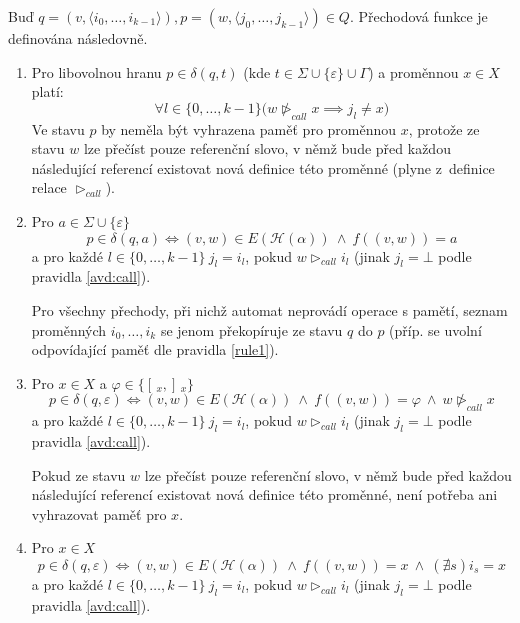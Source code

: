 \documentclass[thesis=B,czech]{FITthesis}[2019/12/23]
\theoremstyle{definition}
\begin{document}
Buď $q=(v, \langle i_0, \dots, i_{k-1} \rangle), p=(w, \langle j_0, \dots, j_{k-1} \rangle) \in Q$. Přechodová funkce je definována následovně.
\begin{enumerate}
	\item{\label{avd:call} Pro libovolnou hranu $p \in \delta(q, t)$ (kde ${t \in \Sigma \cup \{\varepsilon\} \cup \Gamma}$) a proměnnou $x \in X$ platí:	\begin{equation}\forall l \in \{0, \dots, k-1\} \big( w \ntriangleright_{call} x \implies j_l \ne x) \end{equation}
	Ve stavu $p$ by neměla být vyhrazena paměť pro proměnnou $x$, protože ze stavu $w$ lze přečíst pouze referenční slovo, v němž bude před každou následující referencí existovat nová definice této proměnné (plyne z~definice relace $\triangleright_{call}$).
		}
	\item\label{rule2}{Pro $a \in \Sigma\cup\{\varepsilon\}$ 
			\begin{equation}
			p \in \delta(q, a) \iff (v, w) \in E(\mathcal{H}(\alpha)) \ \wedge \ f((v, w))=a
			\end{equation} a pro každé $l \in \{0, \dots, k-1\} \  j_l = i_l$, pokud $w \triangleright_{call} i_l$ (jinak $j_l = \bot$ podle pravidla \ref{avd:call}).
			
		Pro všechny přechody, při nichž automat neprovádí operace s pamětí, seznam proměnných $i_0, \dots, i_k$ se jenom překopíruje ze stavu $q$ do $p$ (příp. se uvolní odpovídající paměť dle pravidla \ref{rule1}). } 
 
	\item{\label{rule3}Pro $x \in X$ a $\varphi \in \{[\,_x, ]\,_x\}$
	 \begin{equation} p \in \delta(q, \varepsilon) \iff (v, w) \in E(\mathcal{H}(\alpha)) \ \wedge \ f((v, w))=\varphi \ \wedge \  w \ntriangleright_{call} x
	\end{equation}  a 
			pro každé $l \in \{0, \dots, k-1\} \  j_l = i_l$, pokud $w \triangleright_{call} i_l$ (jinak $j_l = \bot$ podle pravidla \ref{avd:call}).

Pokud ze stavu $w$ lze přečíst pouze referenční slovo, v němž bude před každou následující referencí existovat nová definice této proměnné, není potřeba ani vyhrazovat paměť pro $x$.}
	\item{Pro $x \in X$ 
		\begin{equation}p \in \delta(q, \varepsilon) \iff (v, w) \in E(\mathcal{H}(\alpha)) \ \wedge \ f((v, w))= x \ \wedge \ (\nexists s) i_s = x
		\end{equation} a 
			pro každé $l \in \{0, \dots, k-1\} \  j_l = i_l$, pokud $w \triangleright_{call} i_l$ (jinak $j_l = \bot$ podle pravidla \ref{avd:call}).
	
}
\end{enumerate}
\end{document}
